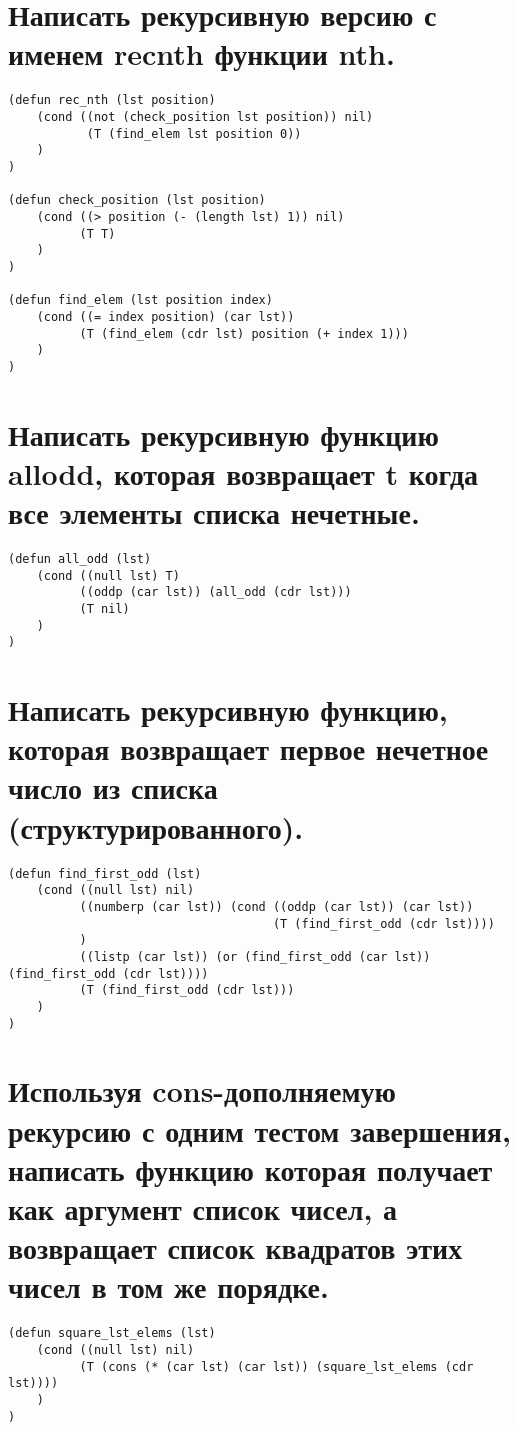 \newpage
\section{Написать рекурсивную версию с именем recnth функции nth.}
\begin{lstlisting}[basicstyle=\footnotesize, caption={Задание 7}]
(defun rec_nth (lst position)
	(cond ((not (check_position lst position)) nil)
 		   (T (find_elem lst position 0))
	)
)

(defun check_position (lst position)
	(cond ((> position (- (length lst) 1)) nil)
		  (T T)
	)
)

(defun find_elem (lst position index)
	(cond ((= index position) (car lst))
		  (T (find_elem (cdr lst) position (+ index 1)))
	)
)
\end{lstlisting}

\section{Написать рекурсивную функцию allodd, которая возвращает t когда все элементы списка нечетные.}
\begin{lstlisting}[basicstyle=\footnotesize, caption=Задание 8]
(defun all_odd (lst)
	(cond ((null lst) T)
		  ((oddp (car lst)) (all_odd (cdr lst)))
	 	  (T nil)
	)
)
\end{lstlisting}

\newpage
\section{Написать рекурсивную функцию, которая возвращает первое нечетное число из списка (структурированного).}
\begin{lstlisting}[basicstyle=\footnotesize, caption=Задание 9]
(defun find_first_odd (lst)
	(cond ((null lst) nil)
		  ((numberp (car lst)) (cond ((oddp (car lst)) (car lst))
		  							 (T (find_first_odd (cdr lst))))
		  )
		  ((listp (car lst)) (or (find_first_odd (car lst)) (find_first_odd (cdr lst))))
		  (T (find_first_odd (cdr lst)))
	)
)
\end{lstlisting}

\section{Используя cons-дополняемую рекурсию с одним тестом завершения, написать функцию которая получает как аргумент список чисел, а возвращает список 	квадратов этих чисел в том же порядке.}
\begin{lstlisting}[basicstyle=\footnotesize, caption=Задание 10]
(defun square_lst_elems (lst)
	(cond ((null lst) nil)
		  (T (cons (* (car lst) (car lst)) (square_lst_elems (cdr lst))))
	)
)
\end{lstlisting}